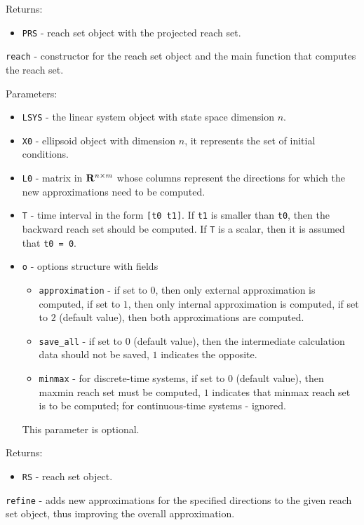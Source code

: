 Returns:
\begin{itemize}
\item {\tt PRS} - reach set object with the projected reach set.
\end{itemize}

\newpage

{\Large {\tt reach}} - constructor for the reach set object and the main
function that computes the reach set.

Parameters:
\begin{itemize}
\item {\tt LSYS} - the linear system object with state space dimension $n$.
\item {\tt X0} - ellipsoid object with dimension $n$, it represents
the set of initial conditions.
\item {\tt L0} - matrix in ${\bf R}^{n\times m}$ whose columns represent the
directions for which the new approximations need to be computed.
\item {\tt T} - time interval in the form {\tt [t0 t1]}. If {\tt t1} is
smaller than {\tt t0}, then the backward reach set should be computed.
If {\tt T} is a scalar, then it is assumed that {\tt t0 = 0}.
\item {\tt o} - options structure with fields
\begin{itemize}
\item {\tt approximation} - if set to $0$, then only external approximation
is computed, if set to $1$, then only internal approximation is computed,
if set to $2$ (default value), then both approximations are computed.
\item {\tt save\_all} - if set to $0$ (default value), then the intermediate
calculation data should not be saved, $1$ indicates the opposite.
\item {\tt minmax} - for discrete-time systems, if set to $0$ (default value),
then maxmin reach set must be computed, $1$ indicates that minmax reach set is
to be computed; for continuous-time systems - ignored.
\end{itemize}
This parameter is optional.
\end{itemize}

Returns:
\begin{itemize}
\item {\tt RS} - reach set object.
\end{itemize}

\newpage

{\Large {\tt refine}} - adds new approximations for the specified directions
to the given reach set object, thus improving the overall approximation.

